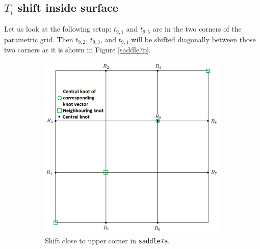 \documentclass{article}
\begin{document}
\subsection{$T_i$ shift inside surface}

\vspace{6pt}

Let us look at the following setup: $t_{9, 1}$ and $t_{9, 5}$ are in the two corners of the parametric grid. Then $t_{9, 2}$, $t_{9, 3}$, and $t_{9, 4}$ will be shifted diagonally between those two corners as it is shown in Figure \ref{saddle7p}.

\begin{figure}[H]
\centering
\begin{subfigure}[b]{0.32\textwidth}
\includegraphics[width=\textwidth]{saddle7aparam}
\caption{Shift close to upper corner in \texttt{saddle7a}.}
\label{saddle7ap}
\end{subfigure}
\begin{subfigure}[b]{0.32\textwidth}

\end{subfigure}
\end{figure}
\end{document}
